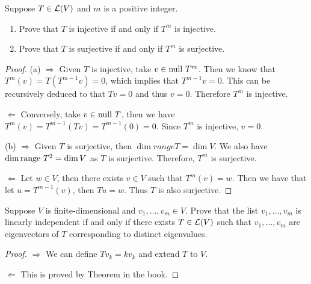 \documentclass{extarticle}
\begin{document}


\begin{problem}{33}
    Suppose \(T \in \mathcal{L}(V)\) and \(m\) is a positive integer. 
    \begin{enumerate}[label=(\alph*)]
        \item Prove that \(T\) is injective if and only if \(T^m\) is injective. 
        \item Prove that \(T\) is surjective if and only if \(T^m\) is surjective.
    \end{enumerate}
\end{problem}

\begin{proof}
(a) \(\Rightarrow\) Given \(T\) is injective, take \(v \in \text{null } T^m\). Then we know that 
\(T^m(v) = T(T^{m-1}v) = 0\), which implies that \(T^{m-1}v = 0\). This can be recursively 
deduced to that \(Tv = 0\) and thus \(v = 0\). Therefore \(T^m\) is injective. 

\(\Leftarrow\) Conversely, take \(v \in \text{null } T\), then we have \(T^m(v)
=T^{m-1}(Tv) = T^{m-1}(0) = 0\). Since \(T^m\) is injective, \(v=0\). 

(b) \(\Rightarrow\) Given \(T\) is surjective, then \(\dim range T = \dim V\). We also have 
\(\dim \text{range } T^2 = \dim V\) as \(T\) is surjective. Therefore, \(T^m\) is surjective. 

\(\Leftarrow\) Let \(w \in V\), then there exists \(v \in V\) such that \(T^m(v) = w\). Then 
we have that let \(u = T^{m-1}(v)\), then \(Tu = w\). Thus \(T\) is also surjective.  
\end{proof}

\begin{problem}{34}
    Suppose \(V\) is finite-dimensional and \(v_1, \ldots, v_m \in V\). Prove that 
    the list \(v_1, \ldots, v_m\) is linearly independent if and only if there 
    exists \(T \in \mathcal{L}(V)\) such that \(v_1, \ldots, v_m\) are eigenvectors of \(T\)
    corresponding to distinct eigenvalues. 
\end{problem}

\begin{proof}
\(\Rightarrow\) We can define \(Tv_k = k v_k\) and extend \(T\) to \(V\). 

\(\Leftarrow\) This is proved by Theorem in the book.
\end{proof}
\end{document}
